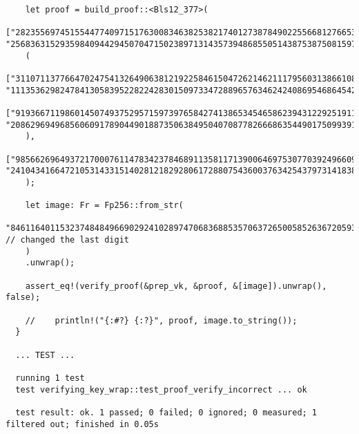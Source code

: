 \documentclass{article}
\begin{document}
\begin{lstlisting}
    let proof = build_proof::<Bls12_377>(
    ["2823556974515544774097151763008346382538217401273878490225566812766536738796196154138387932214916091703926798612", "256836315293598409442945070471502389713143573948685505143875387508159714195596227342715425692593966353228874272253"],
    (
    ["31107113776647024754132649063812192258461504726214621117956031386610890802548704229846887183629711420377939432119", "111353629824784130583952282242830150973347288965763462424086954686454292967282100836332310927094987906314221421873"],
    ["91936671198601450749375295715973976584274138653454658623943122925191168704925205918404144895071632258580325591842", "208629694968560609178904490188735063849504070877826668635449017509939169002653787652914605885048807640820436312893"]
    ),
    ["98566269649372170007611478342378468911358117139006469753077039249660968858754944774214496198826225135709632991983", "241043416647210531433151402812182928061728807543600376342543797314183884387241527972417219291397635999358690899902"]
    );

    let image: Fr = Fp256::from_str(
    "846116401153237484849669029241028974706836885357063726500585263672059318072", // changed the last digit
    )
    .unwrap();

    assert_eq!(verify_proof(&prep_vk, &proof, &[image]).unwrap(), false);

    //    println!("{:#?} {:?}", proof, image.to_string());
  }

  ... TEST ...

  running 1 test
  test verifying_key_wrap::test_proof_verify_incorrect ... ok

  test result: ok. 1 passed; 0 failed; 0 ignored; 0 measured; 1 filtered out; finished in 0.05s

\end{lstlisting}
\end{document}
